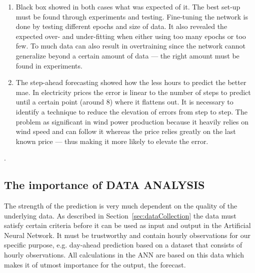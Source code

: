 \begin{enumerate}
\item Black box showed in both cases what was expected of it. The best set-up must be found through experiments and testing. Fine-tuning the network is done by testing different epochs and size of data. It also revealed the expected over- and under-fitting when either using too many epochs or too few. To much data can also result in overtraining since the network cannot generalize beyond a certain amount of data --- the right amount must be found in experiments. 
\item The step-ahead forecasting showed how the less hours to predict the better mae. In electricity prices the error is linear to the number of steps to predict until a certain point (around 8) where it flattens out. It is necessary to identify a technique to reduce the elevation of errors from step to step. The problem as significant in wind power production because it heavily relies on wind speed and can follow it whereas the price relies greatly on the last known price --- thus making it more likely to elevate the error. 
\end{enumerate}



.

\subsection{The importance of DATA ANALYSIS}
The strength of the prediction is very much dependent on the quality of the underlying data. As described in Section~\ref{sec:dataCollection} the data must satisfy certain criteria before it can be used as input and output in the Artificial Neural Network. It must be trustworthy and contain hourly observations for our specific purpose, e.g. day-ahead prediction based on a dataset that consists of hourly observations. All calculations in the ANN are based on this data which makes it of utmost importance for the output, the forecast.

